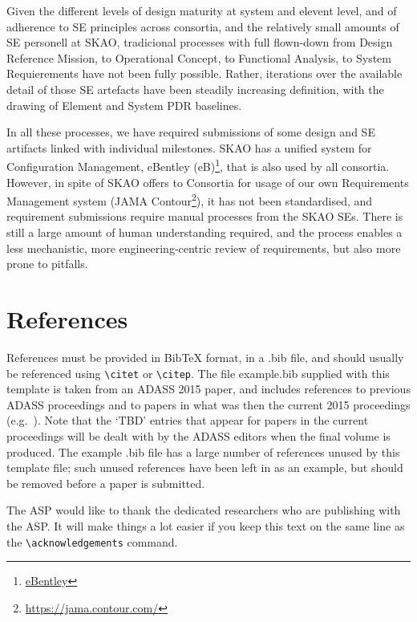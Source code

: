 \documentclass[11pt,twoside]{article}
\begin{document}
Given the different levels of design maturity at system and elevent level, and of adherence to SE principles across consortia, and the relatively small amounts of SE personell at SKAO, tradicional processes with full flown-down from Design Reference Mission, to Operational Concept, to Functional Analysis, to System Requierements have not been fully possible. Rather, iterations over the available detail of those SE artefacts have been steadily increasing definition, with the drawing of Element and System PDR baselines.

In all these processes, we have required submissions of some design and SE artifacts linked with individual milestones. SKAO has a unified system for Configuration Management, eBentley (eB)\footnote{\url{eBentley}}, that is also used by all consortia. However, in spite of SKAO offers to Consortia for usage of our own Requirements Management system (JAMA Contour\footnote{\url{https://jama.contour.com/}}), it has not been standardised, and requirement submissions require manual processes from the SKAO SEs. There is still a large amount of human understanding required, and the process enables a less mechanistic, more engineering-centric review of requirements, but also more prone to pitfalls.


\section{References}
References must be provided in BibTeX format, in a .bib file, and should usually be referenced using \verb"\citet" or \verb"\citep". The file example.bib supplied with this template is taken from an ADASS 2015 paper, and includes references to previous ADASS proceedings 
\citep[such as][]{1999ASPC..172..487P} and to papers in what was then the current 2015 proceedings (e.g.\ \citet{O11-4_adassxxv}). Note that the `TBD' entries that appear for papers in the current proceedings will be dealt with by the ADASS editors when the final volume is produced. The example .bib file has a large number of references unused by this template file; such unused references have been left in as an example, but should be removed before a paper is submitted.

\acknowledgements The ASP would like to thank the dedicated researchers who are publishing with the ASP.  It will make things a lot easier if you keep this text on the same line as the \verb"\acknowledgements" command.


\end{document}
